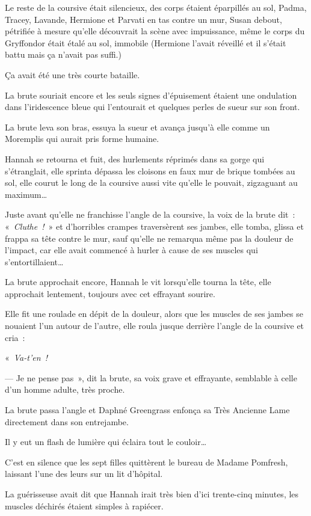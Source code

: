 Le reste de la coursive était silencieux, des corps étaient éparpillés au sol, Padma, Tracey, Lavande, Hermione et Parvati en tas contre un mur, Susan debout, pétrifiée à mesure qu'elle découvrait la scène avec impuissance, même le corps du Gryffondor était étalé au sol, immobile (Hermione l'avait réveillé et il s'était battu mais ça n'avait pas suffi.)

Ça avait été une très courte bataille.

La brute souriait encore et les seuls signes d'épuisement étaient une ondulation dans l'iridescence bleue qui l'entourait et quelques perles de sueur sur son front.

La brute leva son bras, essuya la sueur et avança jusqu'à elle comme un Moremplis qui aurait pris forme humaine.

Hannah se retourna et fuit, des hurlements réprimés dans sa gorge qui s'étranglait, elle sprinta dépassa les cloisons en faux mur de brique tombées au sol, elle courut le long de la coursive aussi vite qu'elle le pouvait, zigzaguant au maximum…

Juste avant qu'elle ne franchisse l'angle de la coursive, la voix de la brute dit~: «~\emph{Cluthe~!}~» et d'horribles crampes traversèrent ses jambes, elle tomba, glissa et frappa sa tête contre le mur, sauf qu'elle ne remarqua même pas la douleur de l'impact, car elle avait commencé à hurler à cause de ses muscles qui s'entortillaient…

La brute approchait encore, Hannah le vit lorsqu'elle tourna la tête, elle approchait lentement, toujours avec cet effrayant sourire.

Elle fit une roulade en dépit de la douleur, alors que les muscles de ses jambes se nouaient l'un autour de l'autre, elle roula jusque derrière l'angle de la coursive et cria~:

«~\emph{Va-t'en~!}

--- Je ne pense pas~», dit la brute, sa voix grave et effrayante, semblable à celle d'un homme adulte, très proche.

La brute passa l'angle et Daphné Greengrass enfonça sa Très Ancienne Lame directement dans son entrejambe.

Il y eut un flash de lumière qui éclaira tout le couloir…

\later

C'est en silence que les sept filles quittèrent le bureau de Madame Pomfresh, laissant l'une des leurs sur un lit d'hôpital.

La guérisseuse avait dit que Hannah irait très bien d'ici trente-cinq minutes, les muscles déchirés étaient simples à rapiécer.

